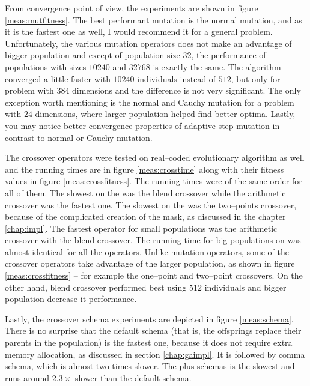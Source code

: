 From convergence point of view, the experiments are shown in figure \ref{meas:mutfitness}. The best performant mutation is the normal mutation, and as it is the fastest one as well, I would recommend it for a general problem. Unfortunately, the various mutation operators does not make an advantage of bigger population and except of population size $32$, the performance of populations with sizes $10240$ and $32768$ is exactly the same. The algorithm converged a little faster with $10240$ individuals instead of $512$, but only for problem with $384$ dimensions and the difference is not very significant. The only exception worth mentioning is the normal and Cauchy mutation for a problem with $24$ dimensions, where larger population helped find better optima. Lastly, you may notice better convergence properties of adaptive step mutation in contrast to normal or Cauchy mutation.

The crossover operators were tested on real--coded evolutionary algorithm as well and the running times are in figure \ref{meas:crosstime} along with their fitness values in figure \ref{meas:crossfitness}. The running times were of the same order for all of them. The slowest on the \cpu was the blend crossover while the arithmetic crossover was the fastest one. The slowest on the \cpu was the two--points crossover, because of the complicated creation of the mask, as discussed in the chapter \ref{chap:impl}. The fastest operator for small populations was the arithmetic crossover with the blend crossover. The running time for big populations on \gpu was almost identical for all the operators. Unlike mutation operators, some of the crossover operators take advantage of the larger population, as shown in figure \ref{meas:crossfitness} -- for example the one--point and two--point crossovers. On the other hand, blend crossover performed best using $512$ individuals and bigger population decrease it performance.

Lastly, the crossover schema experiments are depicted in figure \ref{meas:schema}. There is no surprise that the default schema (that is, the offsprings replace their parents in the population) is the fastest one, because it does not require extra memory allocation, as discussed in section \ref{chap:gaimpl}. It is followed by comma schema, which is almost two times slower. The plus schemas is the slowest and runs around $2.3\times$ slower than the default schema.

